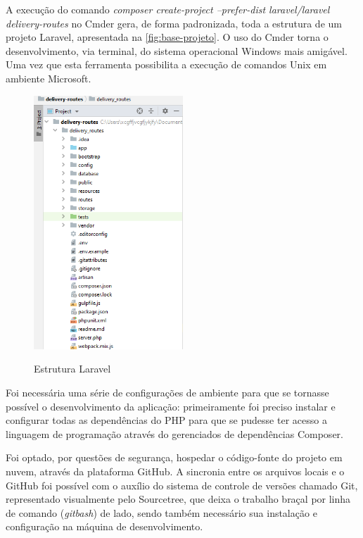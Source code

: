 A execução do comando \textit{composer create-project --prefer-dist laravel/laravel delivery-routes} no Cmder gera, de forma padronizada, toda a estrutura de um projeto Laravel, apresentada na \autoref{fig:base-projeto}. O uso do Cmder torna o desenvolvimento, via terminal, do sistema operacional Windows mais amigável. Uma vez que esta ferramenta possibilita a execução de comandos Unix em ambiente Microsoft.

\begin{figure}[H]
    \centering
    \caption{Estrutura Laravel}
    \includegraphics[width=0.5\textwidth]{./dados/figuras/fig6}
    \label{fig:base-projeto}
\end{figure}

\newpage
Foi necessária uma série de configurações de ambiente para que se tornasse possível o desenvolvimento da aplicação: primeiramente foi preciso instalar e configurar todas as dependências do PHP para que se pudesse ter acesso a linguagem de programação através do gerenciados de dependências Composer. 

Foi optado, por questões de segurança, hospedar o código-fonte do projeto em nuvem, através da plataforma GitHub. A sincronia entre os arquivos locais e o GitHub foi possível com o auxílio do sistema de controle de versões chamado Git, representado visualmente pelo Sourcetree, que deixa o trabalho braçal por linha de comando (\textit{gitbash}) de lado, sendo também necessário sua instalação e configuração na máquina de desenvolvimento. 

